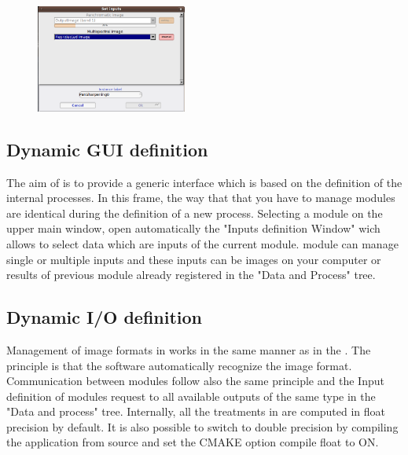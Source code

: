 \begin{figure}
  \center
  \includegraphics[width=0.44\textwidth]{../Art/MonteverdiImages/monteverdi_caching_module.png}
  \label{fig:pixeldescriptioninformations}
\end{figure}


\subsection{Dynamic GUI definition}
The aim of \mont is to provide a generic interface which is based on the definition of the internal processes. 
In this frame, the way that that you have to manage modules are identical during the definition of a new process.
Selecting a module on the upper main window, open automatically the "Inputs definition Window" wich allows to select data which
are inputs of the current module. \mont module can manage single or multiple inputs and these inputs can be images on your 
computer or results of previous module already registered in the "Data and Process" tree.
    
\subsection{Dynamic I/O definition}
Management of image formats in \mont works in the same manner as in the \otb.
The principle is that the software automatically recognize the image format.
Communication between modules follow also the same principle and the Input definition of modules request to all available
outputs of the same type in the "Data and process" tree.
Internally, all the treatments in \mont are computed in float precision by default. It is also possible to switch to double 
precision by compiling the application from source and set the CMAKE option compile float to ON.


